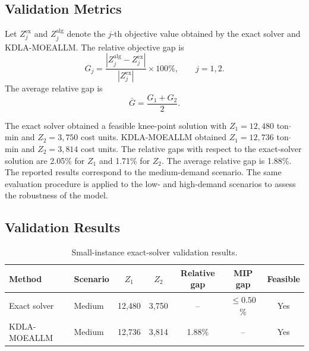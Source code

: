 \documentclass[11pt]{article}
\begin{document}
\subsection{Validation Metrics}


Let $Z_j^{\mathrm{ex}}$ and $Z_j^{\mathrm{alg}}$ denote the $j$-th objective value obtained by the exact solver and KDLA-MOEALLM. The relative objective gap is
\begin{equation}
	G_j =
	\frac{
		|Z_j^{\mathrm{alg}}-Z_j^{\mathrm{ex}}|
	}{
		|Z_j^{\mathrm{ex}}|
	}
	\times 100\%,
	\qquad
	j=1,2.
\label{AppEq:objectiveGap}
\end{equation}
The average relative gap is
\begin{equation}
	\bar{G}
	=
	\frac{G_1+G_2}{2}.
\label{AppEq:averageGap}
\end{equation}

The exact solver obtained a feasible knee-point solution with $Z_1=12{,}480$ ton$\cdot$min and $Z_2=3{,}750$ cost units. KDLA-MOEALLM obtained $Z_1=12{,}736$ ton$\cdot$min and $Z_2=3{,}814$ cost units. The relative gaps with respect to the exact-solver solution are 2.05\% for $Z_1$ and 1.71\% for $Z_2$. The average relative gap is 1.88\%. The reported results correspond to the medium-demand scenario. The same evaluation procedure is applied to the low- and high-demand scenarios to assess the robustness of the model.

\subsection{Validation Results}

\begin{table}[!htbp]
	\centering
	\small
	\caption{Small-instance exact-solver validation results.}
\label{AppTab:exactResults}
	\begin{tabular}{llccccc}
		\toprule
		\textbf{Method} & \textbf{Scenario} & \textbf{$Z_1$} & \textbf{$Z_2$} & \textbf{Relative gap} & \textbf{MIP gap} & \textbf{Feasible} \\
		\midrule
		Exact solver & Medium & 12{,}480 & 3{,}750 & -- & $\leq 0.50$\% & Yes \\
		KDLA-MOEALLM & Medium & 12{,}736 & 3{,}814 & 1.88\% & -- & Yes \\
		\bottomrule
	\end{tabular}
\end{table}
\end{document}
